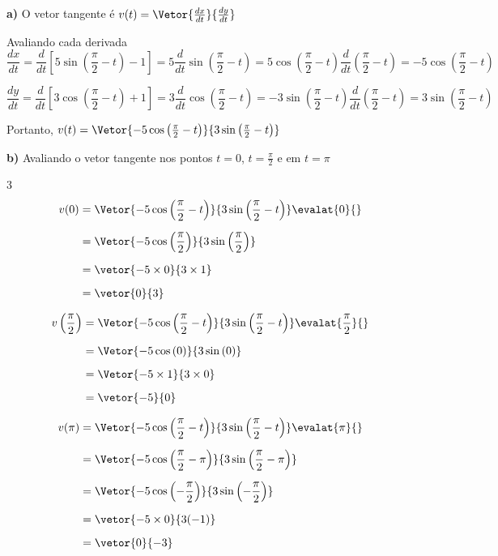 \documentclass[a4paper,12pt,fleqn]{article}
\begin{document}
\begin{answer}
\textbf{a)} \quad
O vetor tangente é
\(
  v(t) = \Vetor{\frac{dx}{dt}}{\frac{dy}{dt}}
\)

Avaliando cada derivada
\medskip
\[
  \frac{dx}{dt}
  = \frac{d}{dt}\left[5 \sin\left(\frac{\pi}{2}-t\right) - 1\right]
  = 5 \frac{d}{dt}\sin\left(\frac{\pi}{2}-t\right)
  = 5 \cos\left(\frac{\pi}{2}-t\right)\frac{d}{dt}\left(\frac{\pi}{2}-t\right)
  = -5 \cos\left(\frac{\pi}{2}-t\right)
\]

\medskip
\[
  \frac{dy}{dt}
  = \frac{d}{dt}\left[3 \cos\left(\frac{\pi}{2}-t\right) + 1\right]
  = 3 \frac{d}{dt}\cos\left(\frac{\pi}{2}-t\right)
  = -3 \sin\left(\frac{\pi}{2}-t\right)\frac{d}{dt}\left(\frac{\pi}{2}-t\right)
  = 3 \sin\left(\frac{\pi}{2}-t\right)
\]

\medskip
Portanto,
\(
  v(t) = \Vetor{-5 \cos\left(\frac{\pi}{2}-t\right)}{3 \sin\left(\frac{\pi}{2}-t\right)}
\)

\clearpage
\textbf{b)} \quad
Avaliando o vetor tangente nos pontos $t=0$, $t=\frac{\pi}{2}$ e em $t=\pi$
\setlength{\mathindent}{0pt}
\begin{multicols}{3}
  \begin{align*}
    v(0)
    & = \Vetor{-5 \cos\left(\frac{\pi}{2}-t\right)}{3 \sin\left(\frac{\pi}{2}-t\right)} \evalat{0}{} \\[2mm]
    & = \Vetor{-5 \cos\left(\frac{\pi}{2}\right)}{3 \sin\left(\frac{\pi}{2}\right)} \\[2mm]
    & = \vetor{-5 \times 0}{3 \times 1} \\[2mm]
    & = \vetor{0}{3}
  \end{align*}

  \newcolumn
  \begin{align*}
    v\left(\frac{\pi}{2}\right)
    & = \Vetor{-5 \cos\left(\frac{\pi}{2}-t\right)}{3 \sin\left(\frac{\pi}{2}-t\right)} \evalat{\frac{\pi}{2}}{} \\[2mm]
    & = \Vetor{-5 \cos\left(0\right)}{3 \sin\left(0\right)} \\[2mm]
    & = \Vetor{-5 \times 1}{3\times 0} \\[2mm]
    & = \vetor{-5}{0}
  \end{align*}

  \newcolumn
  \begin{align*}
    v(\pi)
    & = \Vetor{-5 \cos\left(\frac{\pi}{2}-t\right)}{3 \sin\left(\frac{\pi}{2}-t\right)} \evalat{\pi}{} \\[2mm]
    & = \Vetor{-5 \cos\left(\frac{\pi}{2}-\pi\right)}{3 \sin\left(\frac{\pi}{2}-\pi\right)} \\[2mm]
    & = \Vetor{-5 \cos\left(-\frac{\pi}{2}\right)}{3 \sin\left(-\frac{\pi}{2}\right)} \\[2mm]
    & = \vetor{-5 \times 0}{3(-1)} \\[2mm]
    & = \vetor{0}{-3}
  \end{align*}
\end{multicols}


\end{answer}
\end{document}

